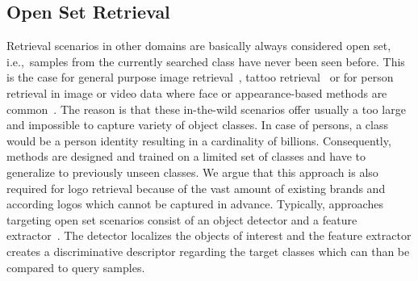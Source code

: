 \documentclass[a4paper,twoside]{article}
\newcommand{\xie}{i.e.}
\begin{document}
\subsection{Open Set Retrieval}
Retrieval scenarios in other domains are basically always considered open set, \xie,~samples from the currently searched class have never been seen before.
This is the case for general purpose image retrieval~\cite{sivic2003}, tattoo retrieval~\cite{manger2012} or for person retrieval in image or video data where face or appearance-based methods are common~\cite{bauml2010,weber2011,herrmann2015b}. The reason is that these in-the-wild scenarios offer usually a too large and impossible to capture variety of object classes. In case of persons, a class would be a person identity resulting in a cardinality of billions. Consequently, methods are designed and trained on a limited set of classes and have to generalize to previously unseen classes. We argue that this approach is also required for logo retrieval because of the vast amount of existing brands and according logos which cannot be captured in advance.
Typically, approaches targeting open set scenarios consist of an object detector and a feature extractor~\cite{zheng2016b}. The detector localizes the objects of interest and the feature extractor creates a discriminative descriptor regarding the target classes which can than be compared to query samples.

\end{document}

